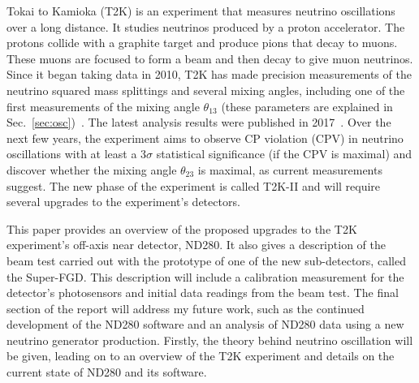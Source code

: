 \documentclass[aps,pra,12pt,notitlepage,tightenlines]{revtex4-1}
\begin{document}
Tokai to Kamioka (T2K) is an experiment that measures neutrino oscillations over a long distance. It studies neutrinos produced by a proton accelerator. The protons collide with a graphite target and produce pions that decay to muons. These muons are focused to form a beam and then decay to give muon neutrinos. Since it began taking data in 2010, T2K has made precision measurements of the neutrino squared mass splittings and several mixing angles, including one of the first measurements of the mixing angle $\theta_{13}$ (these parameters are explained in Sec.\ \ref{sec:osc})~\cite{PhysRevD.88.032002}. The latest analysis results were published in 2017~\cite{Abe:2017bay}. Over the next few years, the experiment aims to observe CP violation (CPV) in neutrino oscillations with at least a 3$\sigma$ statistical significance (if the CPV is maximal) and discover whether the mixing angle $\theta_{23}$ is maximal, as current measurements suggest. The new phase of the experiment is called T2K-II and will require several upgrades to the experiment's detectors.

This paper provides an overview of the proposed upgrades to the T2K experiment's off-axis near detector, ND280. It also gives a description of the beam test carried out with the prototype of one of the new sub-detectors, called the Super-FGD. This description will include a calibration measurement for the detector's photosensors and initial data readings from the beam test. The final section of the report will address my future work, such as the continued development of the ND280 software and an analysis of ND280 data using a new neutrino generator production. Firstly, the theory behind neutrino oscillation will be given, leading on to an overview of the T2K experiment and details on the current state of ND280 and its software.
\end{document}
